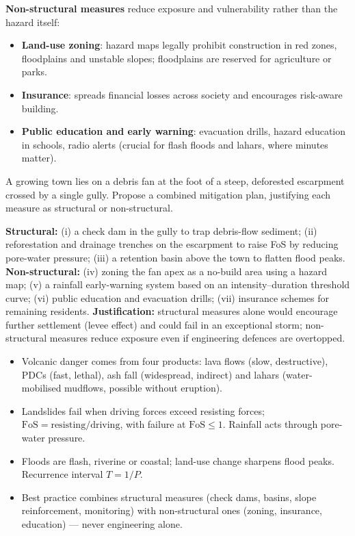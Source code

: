 \documentclass[11pt]{article}
\begin{document}
\textbf{Non-structural measures} reduce exposure and vulnerability rather than the hazard itself:
\begin{itemize}
\item \textbf{Land-use zoning}: hazard maps legally prohibit construction in red zones, floodplains and unstable slopes; floodplains are reserved for agriculture or parks.
\item \textbf{Insurance}: spreads financial losses across society and encourages risk-aware building.
\item \textbf{Public education and early warning}: evacuation drills, hazard education in schools, radio alerts (crucial for flash floods and lahars, where minutes matter).
\end{itemize}

\begin{exercice}
A growing town lies on a debris fan at the foot of a steep, deforested escarpment crossed by a single gully. Propose a combined mitigation plan, justifying each measure as structural or non-structural.
\end{exercice}

\begin{corrige}[Exercise 1]
\textbf{Structural:} (i) a check dam in the gully to trap debris-flow sediment; (ii) reforestation and drainage trenches on the escarpment to raise FoS by reducing pore-water pressure; (iii) a retention basin above the town to flatten flood peaks.
\textbf{Non-structural:} (iv) zoning the fan apex as a no-build area using a hazard map; (v) a rainfall early-warning system based on an intensity--duration threshold curve; (vi) public education and evacuation drills; (vii) insurance schemes for remaining residents.
\textbf{Justification:} structural measures alone would encourage further settlement (levee effect) and could fail in an exceptional storm; non-structural measures reduce exposure even if engineering defences are overtopped.
\end{corrige}

\begin{aretenir}
\begin{itemize}
\item Volcanic danger comes from four products: lava flows (slow, destructive), PDCs (fast, lethal), ash fall (widespread, indirect) and lahars (water-mobilised mudflows, possible without eruption).
\item Landslides fail when driving forces exceed resisting forces; $\mathrm{FoS} = \text{resisting}/\text{driving}$, with failure at $\mathrm{FoS} \leq 1$. Rainfall acts through pore-water pressure.
\item Floods are flash, riverine or coastal; land-use change sharpens flood peaks. Recurrence interval $T = 1/P$.
\item Best practice combines structural measures (check dams, basins, slope reinforcement, monitoring) with non-structural ones (zoning, insurance, education) — never engineering alone.
\end{itemize}
\end{aretenir}
\end{document}
